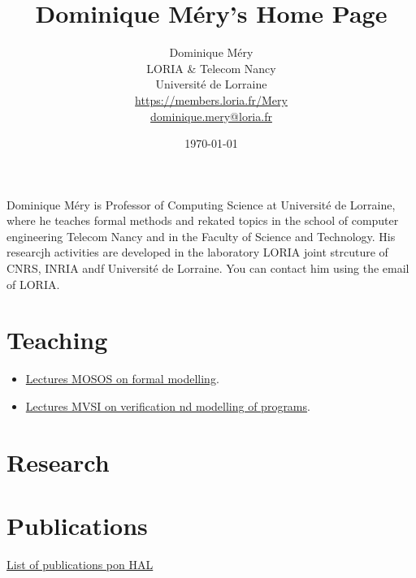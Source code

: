 \documentclass[ 12pt]{article}
\title{Dominique Méry's Home Page}
\author{Dominique M\'ery\\
LORIA \& Telecom Nancy\\ Universit\'e de Lorraine\\
\url{https://members.loria.fr/Mery}\\ \url{dominique.mery@loria.fr}}
\date{\today}
\begin{document}
  \setcounter{ex}{1}
\maketitle


\tableofcontents


Dominique Méry is  Professor of Computing Science at Université  de
Lorraine, where he teaches     formal methods and rekated topics    in the school of computer engineering
Telecom Nancy and in the Faculty of Science and Technology.  His
researcjh activities are developed in the laboratory  LORIA joint
strcuture  of CNRS, INRIA andf Université de Lorraine.  You can
contact him  using the email of LORIA.



\section{Teaching}





\begin{itemize}

\item[] \href{https://mery54.github.io/teaching/mosos/}{Lectures MOSOS 
    on formal modelling}.


  \item[] \href{https://mery54.github.io/teaching/mvsi/}{Lectures MVSI 
    on  verification  nd modelling of programs}.


  
\end{itemize}

\section{Research}

\section{Publications }
\label{sec:publications-}



 \href{https://haltools.inria.fr/Public/afficheRequetePubli.php?auteur_exp=dominique%2Cmery&annee_publideb=1980&annee_publifin=2024&CB_auteur=oui&CB_titre=oui&CB_article=oui&langue=Anglais&tri_exp=annee_publi&tri_exp2=typdoc&tri_exp3=date_publi&ordre_aff=TA&Fen=Aff&css=../css/VisuRubriqueEncadre.css}{List
   of publications pon HAL}
\end{document}
